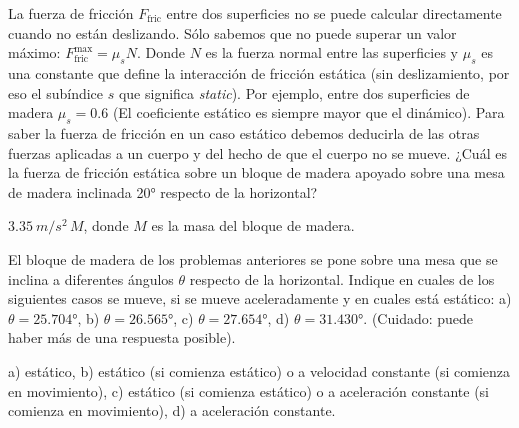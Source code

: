 \documentclass[11pt]{article}
\begin{document}
\begin{multicols}{2}
\begin{exercise}
    La fuerza de fricción $F_{\text{fric}}$ entre dos superficies no se puede calcular directamente cuando no están deslizando. Sólo sabemos que no puede superar un valor máximo: $F_{\text{fric}}^{\text{max}} = \mu_s N$. Donde $N$ es la fuerza normal entre las superficies y $\mu_s$ es una constante que define la interacción de fricción estática (sin deslizamiento, por eso el subíndice $s$ que significa \textit{static}).  Por ejemplo, entre dos superficies de madera $\mu_s = 0.6$ (El coeficiente estático es siempre mayor que el dinámico). Para saber la fuerza de fricción en un caso estático debemos deducirla de las otras fuerzas aplicadas a un cuerpo y del hecho de que el cuerpo no se mueve. ¿Cuál es la fuerza de fricción estática sobre un bloque de madera apoyado sobre una mesa de madera inclinada \ang{20} respecto de la horizontal?
\end{exercise}
\begin{solution}
    $\qty{3.35}{m/s^2} \, M$, donde $M$ es la masa del bloque de  madera.
\end{solution}
\end{multicols}

\begin{multicols}{2}
\begin{exercise}
    El bloque de madera de los problemas anteriores se pone sobre una mesa que se inclina a diferentes ángulos $\theta$ respecto de la horizontal. Indique en cuales de los siguientes casos se mueve, si se mueve aceleradamente y en cuales está estático: a) $\theta = \ang{25.704}$, b) $\theta = \ang{26.565}$, c) $\theta = \ang{27.654}$, d) $\theta = \ang{31.430}$. (Cuidado: puede haber más de una respuesta posible).
\end{exercise}
\begin{solution}
a) estático, b) estático (si comienza estático) o a velocidad constante (si comienza en movimiento), c) estático (si comienza estático) o a aceleración constante (si comienza en movimiento), d) a aceleración constante. 
\end{solution}
\end{multicols}
\end{document}
